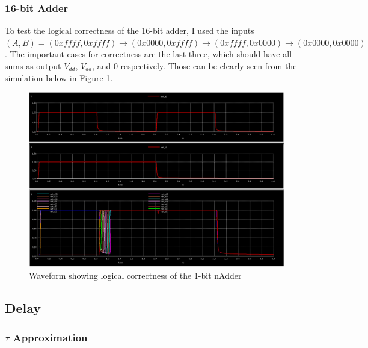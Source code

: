 \documentclass{article}
\begin{document}
\subsubsection{16-bit Adder}
To test the logical correctness of the 16-bit adder, I used the inputs $(A, B) = (0xffff, 0xffff) \rightarrow (0x0000, 0xffff) \rightarrow (0xffff, 0x0000) \rightarrow (0x0000, 0x0000)$. The important cases for correctness are the last three, which should have all sums as output $V_{dd}$, $V_{dd}$, and $0$ respectively. Those can be clearly seen from the simulation below in Figure \ref{fig:test_logic_16b_adder}.

\begin{figure}[H]
  \includegraphics[width=\linewidth]{opt_screenshots/test_logic_16b_adder.png}
  \caption{Waveform showing logical correctness of the 1-bit nAdder}
  \label{fig:test_logic_16b_adder}
\end{figure}

\subsection{Delay}
\subsubsection{$\tau$ Approximation}
\end{document}
